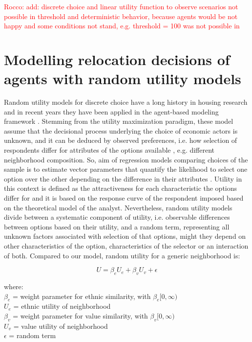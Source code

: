 \documentclass{article}
\newcommand{\rocco}[1]{{\textcolor{red}{Rocco: #1}}} %
\begin{document}
\rocco{add: discrete choice and linear utility function to observe scenarios not possible in threshold and deterministic behavior, because agents would be not happy and some conditions not stand, e.g. threshold = 100 was not possible in \textcite{paolillo2018} }

\section*{Modelling relocation decisions of agents with random utility models}

Random utility models for discrete choice have a long history in housing research \autocite{frankhauser2016deciding} and in recent years they have been applied in the agent-based modeling framework \autocite{bruch2006neighborhood,bruch2012methodological}. Stemming from the utility maximization paradigm, these model assume that the decisional process underlying the choice of economic actors is unknown, and it can be deduced by observed preferences, i.e. how selection of respondents differ for attributes of the options available \autocite{hess2018revisiting}, e.g. different neighborhood composition. So, aim of regression models comparing choices of the sample is to estimate vector parameters that quantify the likelihood to select one option over the other depending on the  difference in their attributes \autocite{manski1977structure}. Utility in this context is defined as the attractiveness for each characteristic the options differ for and it is based on the response curve of the respondent \autocite{bruch2015agent,train2009discrete} imposed based on the theoretical model of the analyst. Nevertheless, random utility models divide between a systematic component of utility, i.e. observable differences between options based on their utility, and a random term, representing all unknown factors associated with selection of that options, might they depend on other characteristics of the option, characteristics of the selector or an interaction of both. Compared to our model, random utility for a generic neighborhood is:

\begin{equation}
    U = \beta_e U_e + \beta_v U_v + \epsilon
\end{equation}

where:\\
$\beta_e$ = weight parameter for ethnic similarity, with $\beta_e [0, \infty)$ \\
$U_e$ = ethnic utility of neighborhood \\
$\beta_v$ = weight parameter for value similarity, with $\beta_v [0, \infty)$ \\
$U_v$ = value utility of neighborhood \\
$\epsilon$ = random term \\
\end{document}

